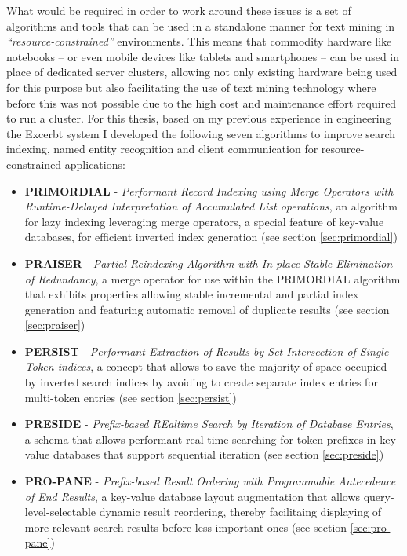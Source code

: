 \documentclass[a4paper, 12pt, twoside, reqn]{report}
\numberwithin{figure}{chapter}
\newtheorem[L]{boxedDefinition}{Definition}
\newtheorem[L]{boxedExample}{Example}
\newcommand{\itquote}[1]{\textit{{``}#1{''}}}
\begin{document}
What would be required in order to work around these issues is a set of algorithms and tools that can be used in a standalone manner for text mining in \itquote{resource-constrained} environments. This means that commodity  hardware like notebooks -- or even mobile devices like tablets and smartphones -- can be used in place of dedicated server clusters, allowing not only existing hardware being used for this purpose but also facilitating the use of text mining technology where before this was not possible due to the high cost and maintenance effort required to run a cluster.
\newpage
For this thesis, based on my previous experience in engineering the Excerbt system I developed the following seven algorithms to improve search indexing, named entity recognition and client communication for resource-constrained applications:
\begin{itemize}
  \item \textbf{PRIMORDIAL} - \textit{Performant Record Indexing using Merge Operators with Runtime-Delayed Interpretation of Accumulated List operations}, an algorithm for lazy indexing leveraging merge operators, a special feature of key-value databases, for efficient inverted index generation (see section \ref{sec:primordial})

  \item \textbf{PRAISER} - \textit{Partial Reindexing Algorithm with In-place Stable Elimination of Redundancy}, a merge operator for use within the PRIMORDIAL algorithm that exhibits properties allowing stable incremental and partial index generation and featuring automatic removal of duplicate results (see section \ref{sec:praiser})

  \item \textbf{PERSIST} - \textit{Performant Extraction of Results by Set Intersection of Single-Token-indices}, a concept that allows to save the majority of space occupied by inverted search indices by avoiding to create separate index entries for multi-token entries (see section \ref{sec:persist})
  
  \item \textbf{PRESIDE} - \textit{Prefix-based REaltime Search by Iteration of Database Entries}, a schema that allows performant real-time searching for token prefixes in key-value databases that support sequential iteration (see section \ref{sec:preside})

  \item \textbf{PRO-PANE} - \textit{Prefix-based Result Ordering with Programmable Antecedence of End Results}, a key-value database layout augmentation that allows query-level-selectable dynamic result reordering, thereby facilitaing displaying of more relevant search results before less important ones (see section \ref{sec:pro-pane})


\end{itemize}
\end{document}
